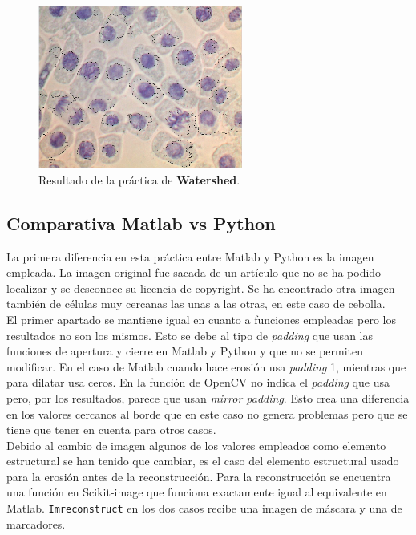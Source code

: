 \begin{figure}[h]
\centering
\includegraphics[width=0.6\textwidth]{imagenes/finalwatershed}
\caption{Resultado de la práctica de \textbf{Watershed}.}
\label{finalwatershed} 
\end{figure}



\subsection{Comparativa Matlab vs Python}

La primera diferencia en esta práctica entre Matlab y Python es la imagen empleada. La imagen original fue sacada de un artículo que no se ha podido localizar y se desconoce su licencia de copyright. Se ha encontrado otra imagen también de células muy cercanas las unas a las otras, en este caso de cebolla.\\

El primer apartado se mantiene igual en cuanto a funciones empleadas pero los resultados no son los mismos. Esto se debe al tipo de \emph{padding} que usan las funciones de apertura y cierre en Matlab y Python y que no se permiten modificar. En el caso de Matlab cuando hace erosión usa \emph{padding} 1, mientras que para dilatar usa ceros. En la función de OpenCV no indica el \emph{padding} que usa pero, por los resultados, parece que usan \emph{mirror padding}. Esto crea una diferencia en los valores cercanos al borde que en este caso no genera problemas pero que se tiene que tener en cuenta para otros casos.\\

Debido al cambio de imagen algunos de los valores empleados como elemento estructural se han tenido que cambiar, es el caso del elemento estructural usado para la erosión antes de la reconstrucción. Para la reconstrucción se encuentra una función en Scikit-image que funciona exactamente igual al equivalente en Matlab. \texttt{Imreconstruct} en los dos casos recibe una imagen de máscara y una de marcadores.\\

